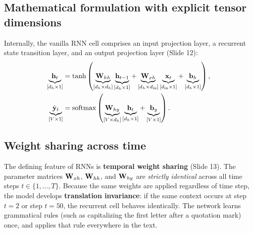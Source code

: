 \documentclass[../../main.tex]{subfiles}
\begin{document}
\subsection{Mathematical formulation with explicit tensor dimensions}
Internally, the vanilla RNN cell comprises an input projection layer, a recurrent state transition layer, and an output projection layer (Slide 12):
\begin{align}
\underbrace{\mathbf{h}_t}_{[d_h \times 1]} &= \tanh\left( \underbrace{\mathbf{W}_{hh}}_{[d_h \times d_h]} \underbrace{\mathbf{h}_{t-1}}_{[d_h \times 1]} + \underbrace{\mathbf{W}_{xh}}_{[d_h \times d_{\text{in}}]} \underbrace{\mathbf{x}_t}_{[d_{\text{in}} \times 1]} + \underbrace{\mathbf{b}_h}_{[d_h \times 1]} \right), \label{eq:rnn_hidden_step} \\
\underbrace{\hat{\mathbf{y}}_t}_{[V \times 1]} &= \operatorname{\mathrm{softmax}}\left( \underbrace{\mathbf{W}_{hy}}_{[V \times d_h]} \underbrace{\mathbf{h}_t}_{[d_h \times 1]} + \underbrace{\mathbf{b}_y}_{[V \times 1]} \right). \label{eq:rnn_output_step}
\end{align}

\subsection{Weight sharing across time}
The defining feature of RNNs is \textbf{temporal weight sharing} (Slide 13). The parameter matrices $\mathbf{W}_{xh}$, $\mathbf{W}_{hh}$, and $\mathbf{W}_{hy}$ are \emph{strictly identical} across all time steps $t \in \{1, \dots, T\}$. 
Because the same weights are applied regardless of time step, the model develops \textbf{translation invariance}: if the same context occurs at step $t=2$ or step $t=50$, the recurrent cell behaves identically. The network learns grammatical rules (such as capitalizing the first letter after a quotation mark) once, and applies that rule everywhere in the text.
\end{document}
